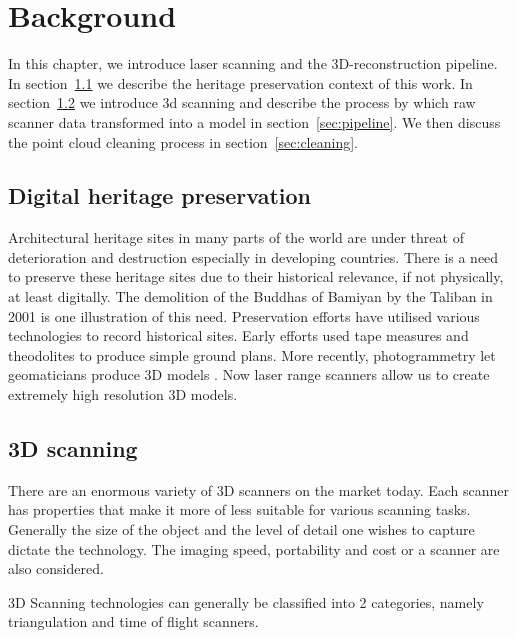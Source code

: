 \chapter{Background} \label{ch:background}

In this chapter, we introduce laser scanning and the 3D-reconstruction pipeline. In section~\ref{sec:heritage} we describe the heritage preservation context of this work. In section~\ref{sec:scanners} we introduce 3d scanning and describe the process by which raw scanner data transformed into a model in section~\ref{sec:pipeline}. We then discuss the point cloud cleaning process in section~\ref{sec:cleaning}.




\section{Digital heritage preservation} \label{sec:heritage}

Architectural heritage sites in many parts of the world are under threat of deterioration and destruction especially in developing countries. There is a need to preserve these heritage sites due to their historical relevance, if not physically, at least digitally. The demolition of  the Buddhas of Bamiyan by the Taliban in 2001 \cite{Toubekis2009} is one illustration of this need. Preservation efforts have utilised various technologies to record historical sites. Early efforts used tape measures and theodolites to produce simple ground plans.  More recently, photogrammetry let geomaticians produce 3D models \cite{Heritage}. Now laser range scanners allow us to create extremely high resolution 3D models.


\section{3D scanning} \label{sec:scanners}

There are an enormous variety of 3D scanners on the market today. Each scanner has properties that make it more of less suitable for various scanning tasks. Generally the size of the object and the level of detail one wishes to capture dictate the technology. The imaging speed, portability and cost or a scanner are also considered.

3D Scanning technologies can generally be classified into 2 categories, namely triangulation and time of flight scanners.

